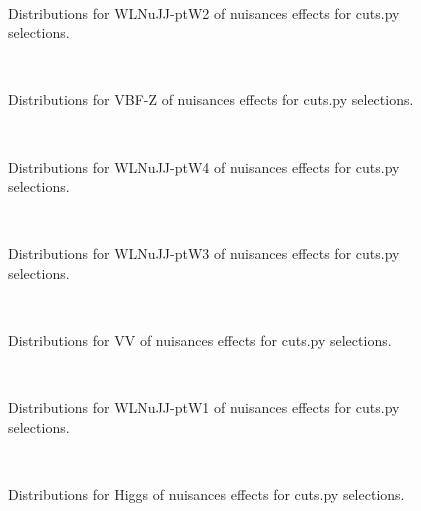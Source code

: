 


\begin{figure}[htbp]  
\centering 
\\ 
\caption{ 
   Distributions for WLNuJJ-ptW2 of nuisances effects for cuts.py selections.
} 
\label{fig:WLNuJJ_ptW2_cuts.py} 
\end{figure} 




\begin{figure}[htbp]  
\centering 
\\ 
\caption{ 
   Distributions for VBF-Z of nuisances effects for cuts.py selections.
} 
\label{fig:VBF-Z_cuts.py} 
\end{figure} 




\begin{figure}[htbp]  
\centering 
\\ 
\caption{ 
   Distributions for WLNuJJ-ptW4 of nuisances effects for cuts.py selections.
} 
\label{fig:WLNuJJ_ptW4_cuts.py} 
\end{figure} 




\begin{figure}[htbp]  
\centering 
\\ 
\caption{ 
   Distributions for WLNuJJ-ptW3 of nuisances effects for cuts.py selections.
} 
\label{fig:WLNuJJ_ptW3_cuts.py} 
\end{figure} 




\begin{figure}[htbp]  
\centering 
\\ 
\caption{ 
   Distributions for VV of nuisances effects for cuts.py selections.
} 
\label{fig:VV_cuts.py} 
\end{figure} 




\begin{figure}[htbp]  
\centering 
\\ 
\caption{ 
   Distributions for WLNuJJ-ptW1 of nuisances effects for cuts.py selections.
} 
\label{fig:WLNuJJ_ptW1_cuts.py} 
\end{figure} 




\begin{figure}[htbp]  
\centering 
\\ 
\caption{ 
   Distributions for Higgs of nuisances effects for cuts.py selections.
} 
\label{fig:Higgs_cuts.py} 
\end{figure} 




